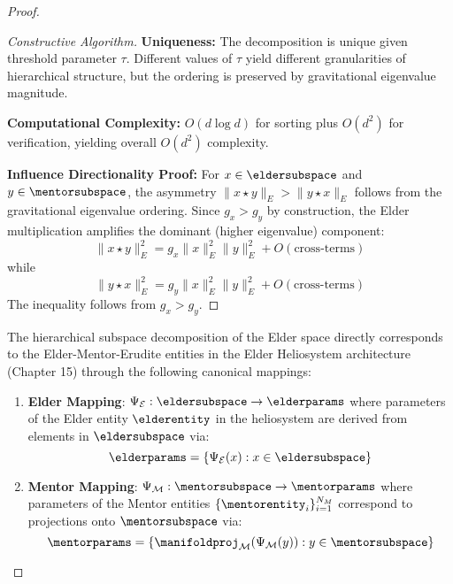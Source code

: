 \begin{proof}
\begin{proof}[Constructive Algorithm]
\textbf{Uniqueness:} The decomposition is unique given threshold parameter $\tau$. Different values of $\tau$ yield different granularities of hierarchical structure, but the ordering is preserved by gravitational eigenvalue magnitude.

\textbf{Computational Complexity:} $O(d \log d)$ for sorting plus $O(d^2)$ for verification, yielding overall $O(d^2)$ complexity.

\textbf{Influence Directionality Proof:} For $x \in \eldersubspace$ and $y \in \mentorsubspace$, the asymmetry $\|x \star y\|_E > \|y \star x\|_E$ follows from the gravitational eigenvalue ordering. Since $g_x > g_y$ by construction, the Elder multiplication amplifies the dominant (higher eigenvalue) component:
\begin{equation}
\|x \star y\|_E^2 = g_x \|x\|_E^2 \|y\|_E^2 + O(\text{cross-terms})
\end{equation}
while 
\begin{equation}
\|y \star x\|_E^2 = g_y \|x\|_E^2 \|y\|_E^2 + O(\text{cross-terms})
\end{equation}
The inequality follows from $g_x > g_y$.
\end{proof}

\begin{theorem}
\label{thm:heliosystem_correspondence}
The hierarchical subspace decomposition of the Elder space directly corresponds to the Elder-Mentor-Erudite entities in the Elder Heliosystem architecture (Chapter 15) through the following canonical mappings:
\begin{enumerate}
    \item \textbf{Elder Mapping}: $\Psi_{\mathcal{E}}: \eldersubspace \rightarrow \elderparams$ where parameters of the Elder entity $\elderentity$ in the heliosystem are derived from elements in $\eldersubspace$ via:
    \begin{equation}
        \elderparams = \{\Psi_{\mathcal{E}}(x) : x \in \eldersubspace\}
    \end{equation}
    
    \item \textbf{Mentor Mapping}: $\Psi_{\mathcal{M}}: \mentorsubspace \rightarrow \mentorparams$ where parameters of the Mentor entities $\{\mentorentity_i\}_{i=1}^{N_M}$ correspond to projections onto $\mentorsubspace$ via:
    \begin{equation}
        \mentorparams = \{\manifoldproj_{\mathcal{M}}(\Psi_{\mathcal{M}}(y)) : y \in \mentorsubspace\}
    \end{equation}
    

\end{enumerate}
\end{theorem}
\end{proof}
